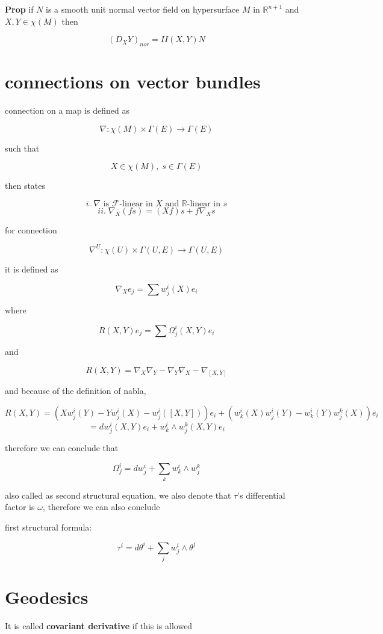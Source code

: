 \documentclass{article}
\begin{document}
\textbf{Prop} if $N$ is a smooth unit normal vector field on hypersurface $M$ in $\mathbb{R}^{n+1}$ and $X,Y\in\chi(M)$ then

\[
(D_XY)_{nor}=II(X,Y)N
\]

\section*{connections on vector bundles}

connection on a map is defined as

\[
\nabla : \chi(M) \times \Gamma(E)\rightarrow\Gamma(E)
\]

such that

\[
X\in \chi(M), \; s\in\Gamma(E)
\]

then states

\[
i. \; \nabla \text{ is } \mathcal{F}\text{-linear in } X \text{ and } \mathbb{R}\text{-linear in } s
\]
\[
ii. \; \nabla_X(fs)=(Xf)s+f\nabla_Xs
\]

for connection

\[
\nabla^U:\chi(U)\times \Gamma(U,E)\rightarrow\Gamma(U,E)
\]

it is defined as 

\[
\nabla_Xe_j=\sum w_j^i(X)e_i
\]

where

\[
R(X,Y)e_j=\sum \Omega_j^i(X,Y)e_i
\]

and 

\[
R(X,Y)=\nabla_X \nabla_Y-\nabla_Y\nabla_X-\nabla_{[X,Y]}
\]

and because of the definition of nabla, 

\[
R(X,Y)=(Xw_j^i(Y)-Yw_j^i(X)-w_j^i([X,Y]))e_i+(w_k^i(X)w_j^i(Y)-w_k^i(Y)w_j^k(X))e_i
\]
\[
=dw_j^i(X,Y)e_i+w_k^i\wedge w_j^k(X,Y)e_i
\]

therefore we can conclude that

\[
\Omega_j^i=dw_j^i+\sum_{k}w_k^i\wedge w_j^k
\]

also called as second structural equation, we also denote that $\tau$'s differential factor is $\omega$, therefore we can also conclude

first structural formula:

\[
\tau^i=d\theta^i+\sum_jw_j^i\wedge\theta^j
\]

\section*{Geodesics}

It is called \textbf{covariant derivative} if this is allowed
\end{document}
